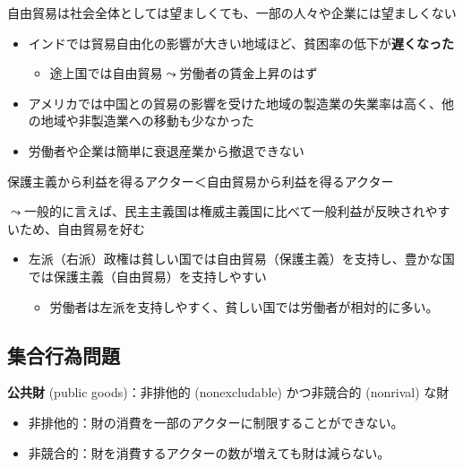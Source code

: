 \documentclass[
  xelatex,
  ja=standard]{bxjsarticle}
\providecommand{\tightlist}{%
  \setlength{\itemsep}{0pt}\setlength{\parskip}{0pt}}\usepackage{longtable,booktabs,array}
\begin{document}
自由貿易は社会全体としては望ましくても、一部の人々や企業には望ましくない

\begin{itemize}
\tightlist
\item
  インドでは貿易自由化の影響が大きい地域ほど、貧困率の低下が\textbf{遅くなった}\citep{topalova2010}

  \begin{itemize}
  \tightlist
  \item
    途上国では自由貿易\(\leadsto\)労働者の賃金上昇のはず
  \end{itemize}
\item
  アメリカでは中国との貿易の影響を受けた地域の製造業の失業率は高く、他の地域や非製造業への移動も少なかった\citep{autor2013}
\item
  労働者や企業は簡単に衰退産業から撤退できない
\end{itemize}

保護主義から利益を得るアクター＜自由貿易から利益を得るアクター

\(\leadsto\)一般的に言えば、民主主義国は権威主義国に比べて一般利益が反映されやすいため、自由貿易を好む\citep{milner2005, kono2006}

\begin{itemize}
\tightlist
\item
  左派（右派）政権は貧しい国では自由貿易（保護主義）を支持し、豊かな国では保護主義（自由貿易）を支持しやすい\citep{dutt2002}

  \begin{itemize}
  \tightlist
  \item
    労働者は左派を支持しやすく、貧しい国では労働者が相対的に多い。
  \end{itemize}
\end{itemize}

\hypertarget{ux96c6ux5408ux884cux70baux554fux984c}{%
\subsection{集合行為問題}\label{ux96c6ux5408ux884cux70baux554fux984c}}

\textbf{公共財} (public goods)：非排他的 (nonexcludable) かつ非競合的
(nonrival) な財

\begin{itemize}
\tightlist
\item
  非排他的：財の消費を一部のアクターに制限することができない。
\item
  非競合的：財を消費するアクターの数が増えても財は減らない。
\end{itemize}
\end{document}
